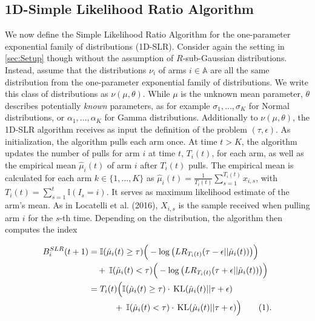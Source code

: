\documentclass[11pt,]{article}
\newcommand{\KL}{\,\text{KL}}
\newcommand*{\Alignyesnumber}{\refstepcounter{equation}\tag{\theequation}}%
\begin{document}
\subsection{\texorpdfstring{1D-Simple Likelihood Ratio Algorithm
\label{sec:1DSLR}}{1D-Simple Likelihood Ratio Algorithm }}\label{d-simple-likelihood-ratio-algorithm}

We now define the Simple Likelihood Ratio Algorithm for the
one-parameter exponential family of distributions (1D-SLR). Consider
again the setting in \autoref{sec:Setup} though without the assumption
of \(R\)-sub-Gaussian distributions. Instead, assume that the
distributions \(\nu_i\) of arms \(i \in \mathbb{A}\) are all the same
distribution from the one-parameter exponential family of distributions.
We write this class of distributions as \(\nu(\mu, \theta)\). While
\(\mu\) is the unknown mean parameter, \(\theta\) describes potentially
\emph{known} parameters, as for example \(\sigma_1, ..., \sigma_K\) for
Normal distributions, or \(\alpha_1, ..., \alpha_K\) for Gamma
distributions. Additionally to \(\nu(\mu, \theta)\), the 1D-SLR
algorithm receives as input the definition of the problem
\((\tau, \epsilon)\). As initialization, the algorithm pulls each arm
once. At time \(t>K\), the algorithm updates the number of pulls for arm
\(i\) at time \(t\), \(T_i(t)\), for each arm, as well as the empirical
mean \(\hat{\mu}_i(t)\) of arm \(i\) after \(T_i(t)\) pulls. The
empirical mean is calculated for each arm \(k\in \{1,...,K\}\) as
\(\hat{\mu}_i(t) = \frac{1}{T_i(t)}\sum_{s=1}^{T_i(t)} x_{i,s}\), with
\(T_i(t) = \sum_{s=1}^{t}\mathbb{I}(I_s = i)\). It serves as maximum
likelihood estimate of the arm's mean. As in Locatelli et al. (2016),
\(X_{i,s}\) is the sample received when pulling arm \(i\) for the
\(s\)-th time. Depending on the distribution, the algorithm then
computes the index

\begin{align*}
B_i^{SLR}(t+1) & = \mathbb{I}(\hat{\mu}_i(t)\geq \tau) \Big(-\log \big(LR_{T_i(t)}(\tau-\epsilon||\hat{\mu}_i(t))\big)\Big) \\
& \quad +\: \mathbb{I}(\hat{\mu}_i(t) <\tau) \Big(-\log\big(LR_{T_i(t)}(\tau+\epsilon||\hat{\mu}_i(t))\big)\Big) \\
& = T_i(t) \Big( \mathbb{I}(\hat{\mu}_i(t) \geq \tau)\cdot \KL(\hat{\mu}_i(t)||\tau+\epsilon) \\
& \quad \quad \quad +\: \mathbb{I}(\hat{\mu}_i(t) < \tau)\cdot \KL(\hat{\mu}_i(t)||\tau+\epsilon) \Big) \Alignyesnumber\label{eqn:SLRIndex}.
\end{align*}
\end{document}
